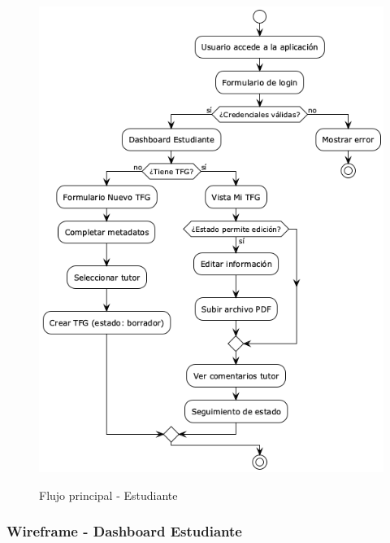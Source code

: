 \documentclass[12pt,a4paper,oneside]{report}
\providecommand{\pandocbounded}[1]{#1}
\begin{document}
\begin{figure}[H]
\centering
\pandocbounded{\includegraphics[keepaspectratio,alt={Flujo principal - Estudiante}]{processed/images/05_diseno_plantuml_4.png}}
\caption{Flujo principal - Estudiante}
\label{fig:flujo-principal-estudiante}
\end{figure}

\subsubsection{Wireframe - Dashboard
Estudiante}\label{wireframe---dashboard-estudiante}
\end{document}

